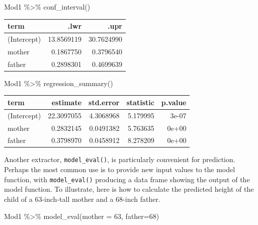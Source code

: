 \documentclass[
  letterpaper,
  DIV=11,
  numbers=noendperiod,
  oneside]{scrreprt}
\newenvironment{Shaded}{\begin{snugshade}}{\end{snugshade}}
\newcommand{\AttributeTok}[1]{\textcolor[rgb]{0.40,0.45,0.13}{#1}}
\newcommand{\DecValTok}[1]{\textcolor[rgb]{0.68,0.00,0.00}{#1}}
\newcommand{\FunctionTok}[1]{\textcolor[rgb]{0.28,0.35,0.67}{#1}}
\newcommand{\NormalTok}[1]{\textcolor[rgb]{0.00,0.23,0.31}{#1}}
\newcommand{\SpecialCharTok}[1]{\textcolor[rgb]{0.37,0.37,0.37}{#1}}
\begin{document}
\begin{Shaded}
\begin{Highlighting}[]
\NormalTok{Mod1 }\SpecialCharTok{\%\textgreater{}\%} \FunctionTok{conf\_interval}\NormalTok{()}
\end{Highlighting}
\end{Shaded}

\ttfamily 
\begin{tabular}{lrr}
\toprule
term & .lwr & .upr\\
\midrule
(Intercept) & 13.8569119 & 30.7624990\\
mother & 0.1867750 & 0.3796540\\
father & 0.2898301 & 0.4699639\\
\bottomrule
\end{tabular} \normalfont
\bigskip

\begin{Shaded}
\begin{Highlighting}[]
\NormalTok{Mod1 }\SpecialCharTok{\%\textgreater{}\%} \FunctionTok{regression\_summary}\NormalTok{()}
\end{Highlighting}
\end{Shaded}

\ttfamily 
\begin{tabular}{lrrrr}
\toprule
term & estimate & std.error & statistic & p.value\\
\midrule
(Intercept) & 22.3097055 & 4.3068968 & 5.179995 & 3e-07\\
mother & 0.2832145 & 0.0491382 & 5.763635 & 0e+00\\
father & 0.3798970 & 0.0458912 & 8.278209 & 0e+00\\
\bottomrule
\end{tabular} \normalfont
\bigskip

Another extractor, \texttt{model\_eval()}, is particularly convenient
for prediction. Perhaps the most common use is to provide new input
values to the model function, with \texttt{model\_eval()} producing a
data frame showing the output of the model function. To illustrate, here
is how to calculate the predicted height of the child of a 63-inch-tall
mother and a 68-inch father.

\begin{Shaded}
\begin{Highlighting}[]
\NormalTok{Mod1 }\SpecialCharTok{\%\textgreater{}\%} \FunctionTok{model\_eval}\NormalTok{(}\AttributeTok{mother =} \DecValTok{63}\NormalTok{, }\AttributeTok{father=}\DecValTok{68}\NormalTok{)}
\end{Highlighting}
\end{Shaded}
\end{document}
